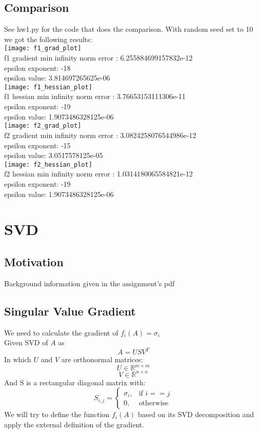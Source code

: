\documentclass{article}
\begin{document}
\subsection{Comparison}
See hw1.py for the code that does the comparison.
With random seed set to 10 we got the following results:\\
\texttt{[image: f1\_grad\_plot]}\\
f1 gradient min infinity norm error : 6.255884699157832e-12\\
epsilon exponent: -18\\
epsilon value: 3.814697265625e-06\\
\texttt{[image: f1\_hessian\_plot]}\\
f1 hessian min infinity norm error : 3.76653153111306e-11\\
epsilon exponent: -19\\
epsilon value: 1.9073486328125e-06\\
\texttt{[image: f2\_grad\_plot]}\\
f2 gradient min infinity norm error : 3.0824258076544986e-12\\
epsilon exponent: -15\\
epsilon value: 3.0517578125e-05\\
\texttt{[image: f2\_hessian\_plot]}\\
f2 hessian min infinity norm error : 1.0314180065584821e-12\\
epsilon exponent: -19\\
epsilon value: 1.9073486328125e-06\\

\newpage
\section{SVD}
\subsection{Motivation}
Background information given in the assignment's pdf
\subsection{Singular Value Gradient}
We need to calculate the gradient of $f_i(A) = \sigma_i$\\
Given SVD of $A$ as $$A=USV^T$$
In which $U$ and $V$ are orthonormal matrices:
$$U \in \mathbb{R}^{m\times m}$$
$$V \in \mathbb{R}^{n\times n}$$
And S is a rectangular diagonal matrix with:
\[
    S_{i,j}= 
\begin{cases}
    \sigma_i,& \text{if } i==j\\
    0,       & \text{otherwise}
\end{cases}
\]
We will try to define the function $f_i(A)$ based on its SVD decomposition and apply the external definition of the gradient.\\
\end{document}
